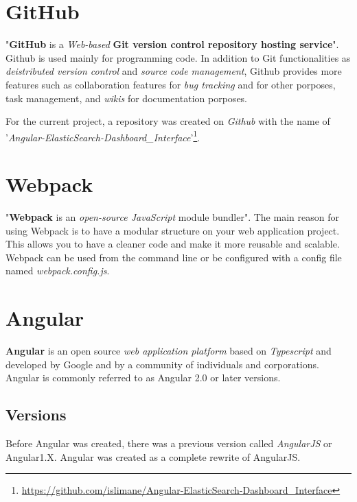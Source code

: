 \documentclass[a4paper, 12pt, english]{book}
\begin{document}
\section{GitHub}
\label{sec:github}

"\textbf{GitHub} is a \textit{Web-based} \textbf{Git version control repository hosting service}". Github is used mainly for programming code. In addition to Git functionalities as \textit{deistributed version control} and \textit{source code management}, Github provides more features such as collaboration features for \textit{bug tracking} and for other porposes, task management, and \textit{wikis} for documentation porposes.

For the current project, a repository was created on \textit{Github} with the name of '\textit{Angular-ElasticSearch-Dashboard\_Interface}'\footnote{\url{https://github.com/islimane/Angular-ElasticSearch-Dashboard\_Interface}}.


\section{Webpack}
\label{sec:webpack}

"\textbf{Webpack} is an \textit{open-source JavaScript} module bundler". The main reason for using Webpack is to have a modular structure on your web application project. This allows you to have a cleaner code and make it more reusable and scalable. Webpack can be used from the command line or be configured with a config file named \textit{webpack.config.js}.


\section{Angular}
\label{sec:angular}

\textbf{Angular} is an open source \textit{web application platform} based on \textit{Typescript} and developed by Google and by a community of individuals and corporations.
Angular is commonly referred to as Angular 2.0 or later versions.

\subsection{Versions}
\label{sec:angular-versions}
Before Angular was created, there was a previous version called \textit{AngularJS} or Angular1.X. Angular was created as a complete rewrite of AngularJS.
\end{document}
